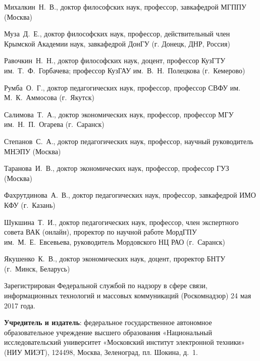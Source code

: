 \begin{multicols}{2}
\begin{flushleft}
    \noindent Михалкин Н. В., доктор философских наук, профессор, завкафедрой МГППУ (Москва)
    
    \noindent Муза Д. Е., доктор философских наук, профессор, действительный член Крымской Академии наук, завкафедрой ДонГУ (г. Донецк, ДНР, Россия) 
    
    \noindent Равочкин Н. Н., доктор философских наук, доцент, профессор КузГТУ им. Т. Ф. Горбачева; профессор КузГАУ им. В. Н. Полецкова (г. Кемерово)
    
    \noindent Румба О. Г., доктор педагогических наук, профессор, профессор СВФУ им. М. К. Аммосова (г. Якутск)
    
    \noindent Салимова Т. А., доктор экономических наук, профессор, профессор МГУ им. Н. П. Огарева (г. Саранск)
    
    \noindent Степанов С. А., доктор педагогических наук, профессор, научный руководитель МНЭПУ (Москва)
    
    \noindent Таранова И. В., доктор экономических наук, профессор, профессор ГУЗ (Москва)
   
    \noindent Фахрутдинова А. В., доктор педагогических наук, профессор, завкафедрой ИМО КФУ (г. Казань)
    
    \noindent Шукшина Т. И., доктор педагогических наук, профессор, член экспертного совета ВАК (онлайн), проректор по научной работе МордГПУ им. М. Е. Евсевьева, руководитель Мордовского НЦ РАО (г. Саранск)
    
    \noindent Якушенко К. В., доктор экономических наук, доцент, проректор БНТУ (г. Минск, Беларусь)
\end{flushleft}    
\end{multicols}

\begin{flushleft}
\footnotesize
Зарегистрирован Федеральной службой по надзору в сфере связи, информационных технологий
и массовых коммуникаций (Роскомнадзор) 24 мая 2017 года.


\textbf{Учредитель и издатель}: федеральное государственное автономное образовательное учреждение
высшего образования «Национальный исследовательский университет «Московский институт
электронной техники» (НИУ МИЭТ), 124498, Москва, Зеленоград, пл. Шокина, д. 1.
\end{flushleft}

